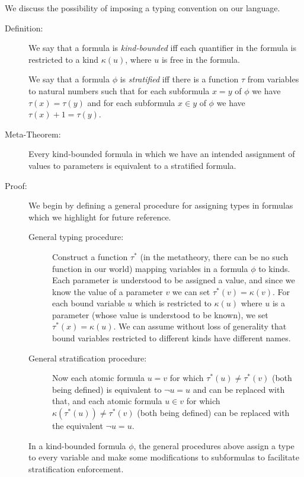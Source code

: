 \documentclass[12pt]{article}
\begin{document}
We discuss the possibility of imposing a typing convention on our language.

\begin{description}

\item[Definition:]  We say that a formula is {\em kind-bounded\/} iff each quantifier in the formula is restricted to a kind $\kappa(u)$, where $u$ is free in the formula.

We say that a formula $\phi$ is {\em stratified\/} iff there is a function $\tau$ from variables to natural numbers such that for each subformula  $x=y$ of $\phi$ we have $\tau(x)=\tau(y)$ and for each subformula $x \in y$ of $\phi$ we have $\tau(x)+1 = \tau(y)$.

\item[Meta-Theorem:]  Every kind-bounded formula in which we have an intended assignment of values to parameters is equivalent to a stratified formula.

\item[Proof:]  We begin by defining a general procedure for assigning types in formulas which we highlight for future reference.
\begin{description}

\item [General typing procedure:]  Construct a function $\tau^*$ (in the metatheory, there can be no such function in our world) mapping variables in a formula $\phi$ to kinds.  Each parameter is understood to be assigned a value, and since we know the value of a parameter $v$ we can set $\tau^*(v) = \kappa(v)$.  For each bound variable $u$ which is restricted to $\kappa(u)$ where
$u$ is a parameter (whose value is understood to be known),  we set $\tau^*(x)=\kappa(u)$.  We can assume without loss of generality that bound variables restricted to different kinds have different names. 

\item[General stratification procedure:]

Now each atomic formula $u=v$ for which $\tau^*(u)\neq \tau^*(v)$ (both being defined) is equivalent to \newline $\neg u=u$ and can be replaced with that, and each atomic formula $u \in v$ for which $\kappa(\tau^*(u)) \neq \tau^*(v)$ (both being defined) can be replaced with the equivalent $\neg u=u$. 
\end{description}



In a kind-bounded formula $\phi$, the general procedures above assign a type to every variable and make some modifications to subformulas to facilitate stratification enforcement.


\end{description}
\end{document}
